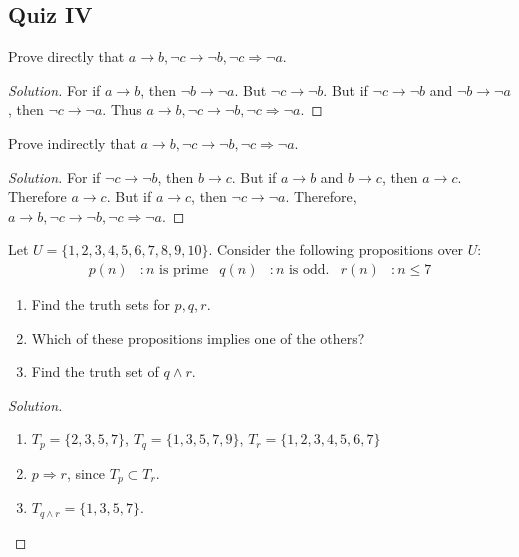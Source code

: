     \subsection{Quiz IV}
    \begin{problem}
    Prove directly that $a\rightarrow b, \neg c\rightarrow \neg b, \neg c \Rightarrow \neg a$.
    \end{problem}
    \begin{proof}[Solution]
    \vspace{-0.5\topsep}
    For if $a\rightarrow b$, then $\neg b \rightarrow \neg a$. But $\neg c \rightarrow \neg b$. But if $\neg c \rightarrow \neg b$ and $\neg b \rightarrow \neg a$, then $\neg c \rightarrow \neg a$. Thus $a\rightarrow b, \neg c \rightarrow \neg b, \neg c \Rightarrow \neg a$.
    \end{proof}
    \begin{problem}
    Prove indirectly that $a\rightarrow b, \neg c \rightarrow \neg b, \neg c \Rightarrow \neg a$.
    \end{problem}
    \begin{proof}[Solution]
    \vspace{-0.5\topsep}
    For if $\neg c \rightarrow \neg b$, then $b\rightarrow c$. But if $a\rightarrow b$ and $b\rightarrow c$, then $a\rightarrow c$. Therefore $a\rightarrow c$. But if $a\rightarrow c$, then $\neg c \rightarrow \neg a$. Therefore, $a\rightarrow b, \neg c \rightarrow \neg b, \neg c \Rightarrow \neg a$.
    \end{proof}
    \begin{problem}
    Let $U = \{1,2,3,4,5,6,7,8,9,10\}$. Consider the following propositions over $U$:
    \begin{align*}
        p(n)&:n\textrm{ is prime} & q(n)&:n\textrm{ is odd.} & r(n)&:n\leq 7
    \end{align*}
    \begin{enumerate}
        \item Find the truth sets for $p,q,r$.
        \item Which of these propositions implies one of the others?
        \item Find the truth set of $q\land r$.
    \end{enumerate}
    \end{problem}
    \begin{proof}[Solution]
    \vspace{-\topsep}
    \
    \begin{enumerate}
        \item $T_{p} = \{2,3,5,7\}$, $T_{q} = \{1,3,5,7,9\}$, $T_{r} = \{1,2,3,4,5,6,7\}$
        \item $p\Rightarrow r$, since $T_{p}\subset T_{r}$.
        \item $T_{q\land r} = \{1,3,5,7\}$.
    \end{enumerate}
    \end{proof}
